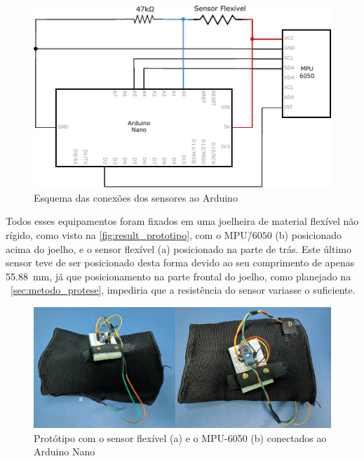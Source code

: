 \begin{figure}[ht]
	\caption{\label{fig:result_schem}Esquema das conexões dos sensores ao Arduino}
	\begin{center}
	    \includegraphics[width=.8\textwidth]{resources/result_schem}
	\end{center}
\end{figure}

Todos esses equipamentos foram fixados em uma joelheira de material flexível não rígido, como visto na \autoref{fig:result_prototipo}, com o MPU\=/\(6050\) (b) posicionado acima do joelho, e o sensor flexível (a) posicionado na parte de trás. Este último sensor teve de ser posicionado desta forma devido ao seu comprimento de apenas \SI{55.88}{\milli\meter}, já que posicionamento na parte frontal do joelho, como planejado na ~\autoref{sec:metodo_protese}, impediria que a resistência do sensor variasse o suficiente.

\begin{figure}[ht]
	\caption{\label{fig:result_prototipo}Protótipo com o sensor flexível (a) e o MPU-6050 (b) conectados ao Arduino Nano}
	\begin{center}
	    \includegraphics[width=.8\textwidth]{resources/result_prototipo}
	\end{center}
\end{figure}

